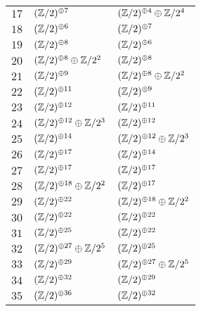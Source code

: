 \begin{supertabular}{|c|p{5.5cm}|p{5.5cm}|}
$17$%
&$(\mathbb{Z}/2)^{\oplus7}$%
&$(\mathbb{Z}/2)^{\oplus4}\oplus\mathbb{Z}/2^{4}$\\

$18$%
&$(\mathbb{Z}/2)^{\oplus6}$%
&$(\mathbb{Z}/2)^{\oplus7}$\\

$19$%
&$(\mathbb{Z}/2)^{\oplus8}$%
&$(\mathbb{Z}/2)^{\oplus6}$\\

$20$%
&$(\mathbb{Z}/2)^{\oplus8}\oplus\mathbb{Z}/2^{2}$%
&$(\mathbb{Z}/2)^{\oplus8}$\\

$21$%
&$(\mathbb{Z}/2)^{\oplus9}$%
&$(\mathbb{Z}/2)^{\oplus8}\oplus\mathbb{Z}/2^{2}$\\

$22$%
&$(\mathbb{Z}/2)^{\oplus11}$%
&$(\mathbb{Z}/2)^{\oplus9}$\\

$23$%
&$(\mathbb{Z}/2)^{\oplus12}$%
&$(\mathbb{Z}/2)^{\oplus11}$\\

$24$%
&$(\mathbb{Z}/2)^{\oplus12}\oplus\mathbb{Z}/2^{3}$%
&$(\mathbb{Z}/2)^{\oplus12}$\\

$25$%
&$(\mathbb{Z}/2)^{\oplus14}$%
&$(\mathbb{Z}/2)^{\oplus12}\oplus\mathbb{Z}/2^{3}$\\

$26$%
&$(\mathbb{Z}/2)^{\oplus17}$%
&$(\mathbb{Z}/2)^{\oplus14}$\\

$27$%
&$(\mathbb{Z}/2)^{\oplus17}$%
&$(\mathbb{Z}/2)^{\oplus17}$\\

$28$%
&$(\mathbb{Z}/2)^{\oplus18}\oplus\mathbb{Z}/2^{2}$%
&$(\mathbb{Z}/2)^{\oplus17}$\\

$29$%
&$(\mathbb{Z}/2)^{\oplus22}$%
&$(\mathbb{Z}/2)^{\oplus18}\oplus\mathbb{Z}/2^{2}$\\

$30$%
&$(\mathbb{Z}/2)^{\oplus22}$%
&$(\mathbb{Z}/2)^{\oplus22}$\\

$31$%
&$(\mathbb{Z}/2)^{\oplus25}$%
&$(\mathbb{Z}/2)^{\oplus22}$\\

$32$%
&$(\mathbb{Z}/2)^{\oplus27}\oplus\mathbb{Z}/2^{5}$%
&$(\mathbb{Z}/2)^{\oplus25}$\\

$33$%
&$(\mathbb{Z}/2)^{\oplus29}$%
&$(\mathbb{Z}/2)^{\oplus27}\oplus\mathbb{Z}/2^{5}$\\

$34$%
&$(\mathbb{Z}/2)^{\oplus32}$%
&$(\mathbb{Z}/2)^{\oplus29}$\\

$35$%
&$(\mathbb{Z}/2)^{\oplus36}$%
&$(\mathbb{Z}/2)^{\oplus32}$\\


\end{supertabular}
